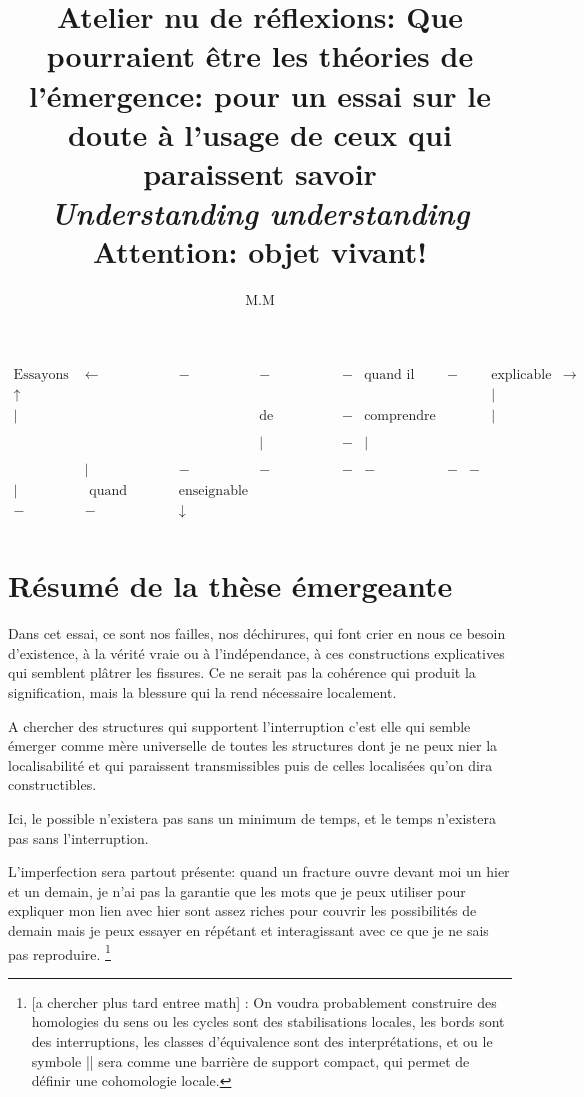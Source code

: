 \documentclass{article}
\title{Atelier nu de réflexions: Que pourraient être les  théories de l'émergence:  pour un  essai sur le doute à l'usage de ceux qui  paraissent  savoir %
\\ \emph{Understanding understanding}
\\ Attention: objet vivant!}
\author{M.M}
\begin{document}
\maketitle
 
$$\begin{matrix}
\text{Essayons }&\leftarrow&-&-&                              -&\text{quand il est}&-&   &\text{explicable} &\rightarrow \\
\uparrow &		&	&	&	&	&	&		&|\\        
|&               &                &\text{de comprendre}&      -&\text{comprendre}&&&| \\
\\          &	               &                   &  |&-&|&\\
\\&|&-&-&-&-&-&-\\
|&\text{ quand d'explication}& \text{enseignable} \\
-&-&\downarrow &\\
\end{matrix}
$$

\section{Résumé de la thèse émergeante}

Dans cet essai, ce sont  nos failles, nos déchirures, qui font crier en nous ce besoin d'existence, à la vérité vraie ou à l'indépendance, à ces constructions explicatives qui semblent plâtrer les fissures. Ce ne serait pas la cohérence qui produit la signification, mais    la blessure qui la rend nécessaire localement.

  A chercher des structures qui supportent  l'interruption c'est elle qui semble  émerger comme mère universelle  de toutes les structures 
 dont je ne peux nier la localisabilité et qui paraissent  transmissibles    puis  de celles localisées qu'on dira constructibles.
 
 Ici, le possible n’existera pas  sans un minimum de temps, et le temps n’existera pas sans l'interruption.
 
 L'imperfection sera partout présente: quand un fracture ouvre devant moi un hier et un demain,  je n'ai pas la garantie que les mots 
que je peux utiliser pour expliquer mon lien avec hier sont assez riches pour couvrir les possibilités de demain mais je peux essayer en répétant et interagissant avec ce que je ne sais pas reproduire.
\footnote{ [a chercher plus tard entree math] : On voudra probablement construire des homologies du sens ou les cycles sont des stabilisations locales, les bords sont des interruptions, les classes d’équivalence sont des interprétations, et ou le symbole ||  sera comme une barrière de support compact,
qui permet de définir une cohomologie locale.}
\end{document}
